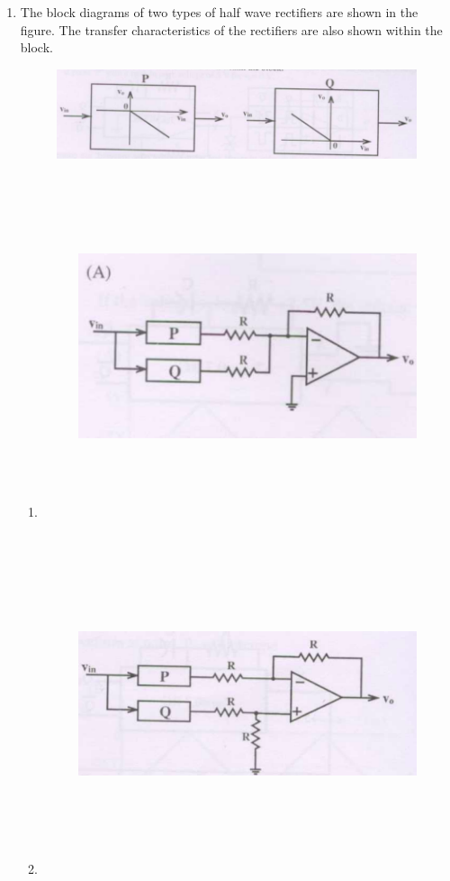\documentclass[journal,12pt,onecolumn]{IEEEtran}
\theoremstyle{remark}
\begin{document}
\begin{enumerate}[start=1, label=Q.\arabic*]
\item  The block diagrams of two types of half wave rectifiers are shown in the figure. The transfer characteristics of the rectifiers are also shown within the block.
\begin{figure}[H]
    \centering
    \includegraphics[width=\columnwidth]{Fig/q42.png}
    \label{fig:placeholder}
\end{figure}
\begin{enumerate}[label=(\Alph*)]
\item 
\begin{figure}[H]
    \centering
    \includegraphics[width=10cm, height=10cm]{Fig/q41-A.png}
    \label{fig:placeholder}
\end{figure}
\item \begin{figure}[H]
    \centering
    \includegraphics[width=10cm, height=10cm]{Fig/q41-B.png}

\end{figure}
\end{enumerate}
\end{enumerate}
\end{document}
